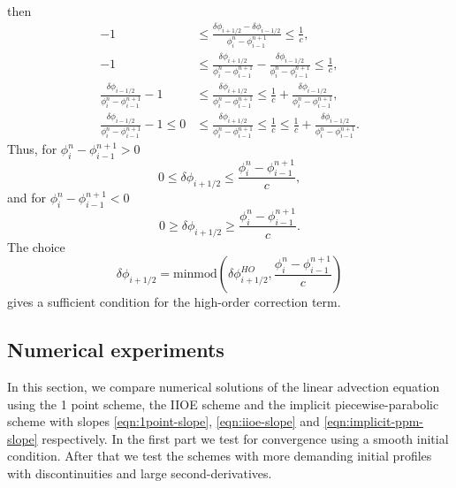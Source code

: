 \documentclass[../thesis.tex]{subfiles}
\begin{document}
then
\begin{equation}
    \begin{split}
        -1
        &\leq
        \frac{\delta \phi_{i+1/2} - \delta \phi_{i-1/2}}
        {\phi_{i}^{n} - \phi_{i-1}^{n+1}}
        \leq
        \frac{1}{c},
        \\
        -1
        &\leq
        \frac{\delta \phi_{i+1/2}}
        {\phi_{i}^{n} - \phi_{i-1}^{n+1}}
        -\frac{\delta \phi_{i-1/2}}
        {\phi_{i}^{n} - \phi_{i-1}^{n+1}}
        \leq
        \frac{1}{c},
        \\
        \frac{\delta \phi_{i-1/2}}
        {\phi_{i}^{n} - \phi_{i-1}^{n+1}}-1
        &\leq
        \frac{\delta \phi_{i+1/2}}
        {\phi_{i}^{n} - \phi_{i-1}^{n+1}}
        \leq
        \frac{1}{c}
        +\frac{\delta \phi_{i-1/2}}
        {\phi_{i}^{n} - \phi_{i-1}^{n+1}},
        \\
        \frac{\delta \phi_{i-1/2}}
        {\phi_{i}^{n} - \phi_{i-1}^{n+1}}-1
        \leq
        0
        &\leq
        \frac{\delta \phi_{i+1/2}}
        {\phi_{i}^{n} - \phi_{i-1}^{n+1}}
        \leq
        \frac{1}{c}
        \leq
        \frac{1}{c}
        +\frac{\delta \phi_{i-1/2}}
        {\phi_{i}^{n} - \phi_{i-1}^{n+1}}.
    \end{split}
\end{equation}
Thus, for \(\phi_{i}^{n} - \phi_{i-1}^{n+1} > 0\)
\begin{equation}
    0
    \leq
    \delta \phi_{i+1/2}
    \leq
    \frac{\phi_{i}^{n} - \phi_{i-1}^{n+1}}{c},
\end{equation}
and for \(\phi_{i}^{n} - \phi_{i-1}^{n+1} < 0\)
\begin{equation}
    0
    \geq
    \delta \phi_{i+1/2}
    \geq
    \frac{\phi_{i}^{n} - \phi_{i-1}^{n+1}}{c}.
\end{equation}
The choice
\begin{equation}
    \delta \phi_{i+1/2} = \mbox{minmod}\left(
        \delta \phi_{i+1/2}^{HO},
        \frac{\phi_{i}^{n} - \phi_{i-1}^{n+1}}{c}
    \right)
\end{equation}
gives a sufficient condition for the high-order correction term.
\subsection[]{Numerical experiments}
In this section, we compare numerical solutions of the linear advection equation using the 1 point scheme, the  IIOE scheme and the implicit piecewise-parabolic scheme with slopes \eqref{eqn:1point-slope}, \eqref{eqn:iioe-slope} and \eqref{eqn:implicit-ppm-slope} respectively.
In the first part we test for convergence using a smooth initial condition. After that we test the schemes with more demanding initial profiles with discontinuities and large second-derivatives.
\end{document}
